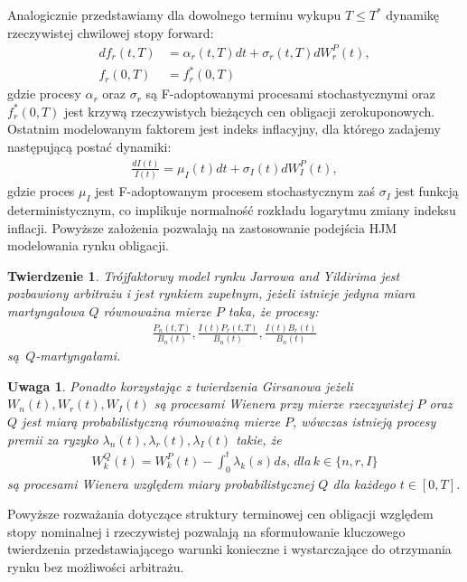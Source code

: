\documentclass{mini}
\theoremstyle{mythstyle}
\newtheorem{Twierdzenie}{Twierdzenie}[chapter]
\newtheorem{Uwaga}{Uwaga}[chapter]
\begin{document}
	Analogicznie przedstawiamy dla dowolnego terminu wykupu $T \le T^*$ dynamikę rzeczywistej chwilowej stopy forward:
	\begin{align*}
		df_r(t,T)  &= \alpha_r(t,T)dt + \sigma_r(t,T) dW_r^P(t),\\
		 f_r(0,T) &= f_r^*(0,T)
	\end{align*}
	gdzie procesy $\alpha_r$ oraz $\sigma_r$ są F-adoptowanymi procesami stochastycznymi oraz $f_r^*(0,T)$ jest krzywą rzeczywistych bieżących cen obligacji zerokuponowych.  
	Ostatnim modelowanym faktorem jest indeks inflacyjny, dla którego zadajemy następującą postać dynamiki:
	\begin{eqnarray*}
		\frac{dI(t)}{I(t)} = \mu_I(t)dt + \sigma_I(t)dW_I^P(t),
	\end{eqnarray*}
	gdzie proces $\mu_I$ jest F-adoptowanym procesem stochastycznym zaś $\sigma_I$ jest funkcją deterministycznym, co implikuje normalność rozkładu logarytmu zmiany indeksu inflacji. Powyższe założenia pozwalają na zastosowanie podejścia HJM modelowania rynku obligacji.
	
	\begin{Twierdzenie}
		Trójfaktorwy model rynku Jarrowa and Yildirima jest pozbawiony arbitrażu i jest rynkiem zupełnym, jeżeli istnieje jedyna miara martyngałowa $Q$ równoważna mierze $P$ taka, że procesy:
		\begin{eqnarray*}
			\frac{P_n(t,T)}{B_n(t)}, \frac{I(t)P_r(t,T)}{B_n(t)}, \frac{I(t)B_r(t)}{B_n(t)} 
		\end{eqnarray*}
		są \,$Q$-martyngałami.\\
	\end{Twierdzenie}	
	
	\begin{Uwaga}
		Ponadto korzystając z twierdzenia Girsanowa jeżeli $W_n(t),W_r(t),W_I(t)$ są procesami Wienera przy mierze rzeczywistej $P$ oraz $Q$ jest miarą probabilistyczną równoważną mierze $P$, wówczas istnieją procesy premii za ryzyko  $\lambda_n(t),\lambda_r(t ),\lambda_I(t)$ takie, że
		\begin{eqnarray*}
			W^Q_k(t) = W^P_k(t) - \int_{0}^{t}\lambda_k(s)ds ,\,dla\, k\in\{n,r,I\}
		\end{eqnarray*}
		są procesami Wienera względem miary probabilistycznej $Q$ dla każdego $t \in [0,T]$. 
	\end{Uwaga}
	
	Powyższe rozważania dotyczące struktury terminowej cen obligacji względem stopy nominalnej i rzeczywistej pozwalają na sformułowanie kluczowego twierdzenia przedstawiającego warunki konieczne i wystarczające do otrzymania rynku bez możliwości arbitrażu.\\
	
\end{document}
